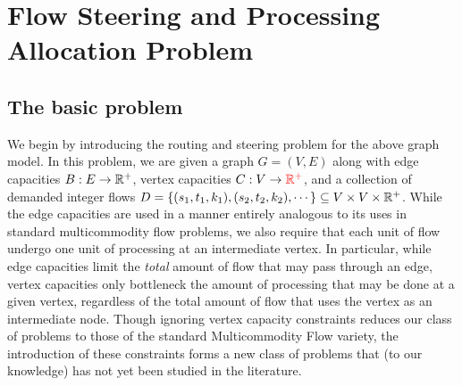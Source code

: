 \section{Flow Steering and Processing Allocation Problem}

\subsection{The basic problem}
\label{subsec:basicproblem}
We begin by introducing the routing and steering problem for the above graph model. In this problem, we are given a  graph $G = (V,E)$ along with edge capacities $B : E \rightarrow \mathbb{R}^+$, vertex capacities $C : V \rightarrow {\color{red} {\ensuremath{\mathbb{R}^+}}}$, and a collection of demanded integer flows $D = \{(s_1, t_1, k_1), (s_2, t_2, k_2), \cdots\} \subseteq V \times V \times \mathbb{R}^+$. While the edge capacities are used in a manner entirely analogous to its uses in standard multicommodity flow problems, we also require that each unit of flow undergo one unit of processing at an intermediate vertex. In particular, while edge capacities limit the \textit{total} amount of flow that may pass through an edge, vertex capacities only bottleneck the amount of processing that may be done at a given vertex, regardless of the total amount of flow that uses the vertex as an intermediate node.    Though ignoring vertex capacity constraints reduces our class of problems to those of the standard Multicommodity Flow variety, the introduction of these constraints forms a new class of problems that (to our knowledge) has not yet been studied in the literature.    \\

